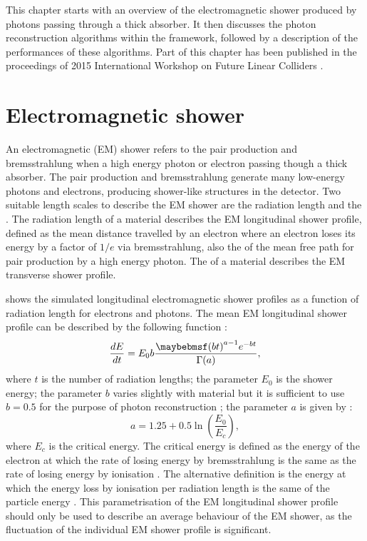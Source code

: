 This chapter starts with an overview of the electromagnetic shower produced by photons passing through a thick absorber. It then discusses the photon reconstruction algorithms within the \pandora framework, followed by a description of the performances of these algorithms.  Part of this chapter has been published in the proceedings of 2015 International Workshop on Future Linear Colliders \cite{Xu:2016rcz}.




\section{Electromagnetic shower}
\label{sec:photonEMshower}
An electromagnetic (EM) shower refers to the pair production and bremsstrahlung when a high energy photon or electron passing though a thick absorber. The pair production and bremsstrahlung generate many low-energy photons and electrons, producing shower-like  structures in the detector. Two suitable length scales to describe the EM shower are the radiation length and the \RM. The radiation length of a material describes the EM longitudinal  shower profile, defined as the mean distance travelled by an electron where an electron loses its energy by a factor of $1/e$ via bremsstrahlung, also the  of the mean free path  for pair production by a high energy photon\cite{segre1977nuclei}. The \RM of a material \cite{PhysRev.149.201,Bathow:1970dn} describes the EM transverse  shower profile.




 shows the simulated longitudinal electromagnetic shower profiles as a function of radiation length for electrons and photons. The mean EM longitudinal shower profile can be described by the following function \cite{Longo:1975wb} :
\begin{equation}
\frac{dE}{dt} = E_0 b \frac{\parenths{bt}^{a-1}e^{-bt}}{\Gamma(a)},
\label{eq:photonEMshower}
\end{equation}
where $t$ is the number of radiation lengths; the parameter $E_0$ is the shower energy; the parameter $b$ varies slightly with material but it is sufficient to use $b = 0.5$ for the purpose of photon reconstruction \cite{Agashe:2014kda}; the parameter $a$ is given by \cite{Thomson:2009rp}:
\begin{equation}
a = 1.25 + 0.5\ln\left(\frac{E_0}{E_c}\right),
\end{equation}
where $E_c$ is the critical energy. The critical energy is defined as the energy of the electron at which the rate of losing energy by bremsstrahlung is the same as the rate of losing energy by ionisation \cite{1964NASSP3012.....B}. The alternative definition is the energy at which the energy loss by ionisation per radiation length is the same of the particle energy \cite{rossi1952high}. This parametrisation of the EM longitudinal shower profile should only be used to describe an average behaviour of the EM shower, as the fluctuation of the individual EM shower profile is significant.

